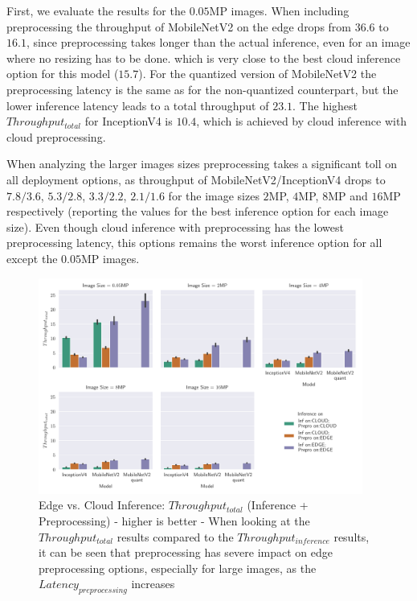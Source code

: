 First, we evaluate the results for the $0.05$MP images.
When including preprocessing the throughput of MobileNetV2 on the edge drops from $36.6$ to $16.1$, since preprocessing takes longer than the actual inference, even for an image where no resizing has to be done.
which is very close to the best cloud inference option for this model ($15.7$).
For the quantized version of MobileNetV2 the preprocessing latency is the same as for the non-quantized counterpart, but the lower inference latency leads to a total throughput of $23.1$.
The highest $Throughput_{total}$ for InceptionV4 is $10.4$, which is achieved by cloud inference with cloud preprocessing.

When analyzing the larger images sizes preprocessing takes a significant toll on all deployment options, as throughput of MobileNetV2/InceptionV4 drops to $7.8/3.6$, $5.3/2.8$, $3.3/2.2$, $2.1/1.6$ for the image sizes $2$MP, $4$MP, $8$MP and $16$MP respectively (reporting the values for the best inference option for each image size).
Even though cloud inference with preprocessing has the lowest preprocessing latency, this options remains the worst inference option for all except the $0.05$MP images.

\begin{figure}[!htb]
\centering
\includegraphics[width=0.95\textwidth]{./Bilder/single_plots/edge_vs_cloud_plots/Edge_vs_Cloud_Inference_Throughput_with_Preprocessing.pdf}
\caption[Edge vs. Cloud Inference:  $Throughput_{total}$ - higher is better]{Edge vs. Cloud Inference:  $Throughput_{total}$ (Inference + Preprocessing) - higher is better - 
When looking at the $Throughput_{total}$ results compared to the $Throughput_{inference}$ results, it can be seen that preprocessing has severe impact on edge preprocessing options, especially for large images, as the $Latency_{preprocessing}$ increases}
\label{fig:EdgeVsCloudTotalThroughput}
\end{figure}





